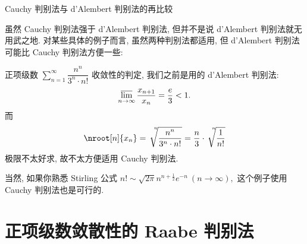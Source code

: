 
\begin{frame}{Cauchy 判别法与 d'Alembert 判别法的再比较}

虽然 Cauchy 判别法强于 d'Alembert 判别法, 但并不是说 d'Alembert 判别法就无用武之地. 对某些具体的例子而言, 虽然两种判别法都适用, 但 d'Alembert 判别法可能比 Cauchy 判别法方便一些:

\pause
\vspace{0.5em}

\begin{eg}
正项级数 $\sum\limits_{n=1}^\infty \dfrac{n^n}{3^n\cdot n!}$ 收敛性的判定, 我们之前是用的 d'Alembert 判别法:
\[\varlimsup_{n\to\infty} \dfrac{x_{n+1}}{x_n} = \dfrac{e}{3} < 1.\]
\pause
而
\[\nroot[n]{x_n} = \sqrt[\leftroot{-7}\uproot{15}n]{\dfrac{n^n}{3^n\cdot n!}} = \dfrac{n}{3} \cdot \sqrt[\leftroot{-7}\uproot{15}n]{\dfrac{1}{n!}}\]
极限不太好求, 故不太方便适用 Cauchy 判别法.

\pause
\vspace{0.5em}

当然, 如果你熟悉 Stirling 公式 $n! \sim \sqrt{2\pi} n^{n+\frac{1}{2}} e^{-n} ~ (n\to\infty),$ 这个例子使用 Cauchy 判别法也是可行的.
\end{eg}

\end{frame}


\section[Raabe\\判别法]{正项级数敛散性的 Raabe 判别法}


